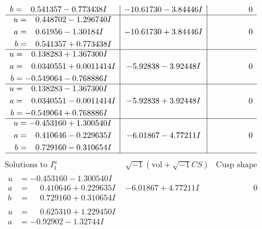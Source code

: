 \documentclass[1p]{elsarticle_modified}
\theoremstyle{definition}
\newcommand{\I}{\sqrt{-1}}
\begin{document}
$$\begin{array}{c|c|c}
\begin{aligned}
b &= \phantom{-}0.541357 - 0.773438 I\end{aligned}
 & -10.61730 - 3.84446 I & \phantom{-0.000000 } 0 \\ \hline\begin{aligned}
u &= \phantom{-}0.448702 - 1.296740 I \\
a &= \phantom{-}0.61956 - 1.30184 I \\
b &= \phantom{-}0.541357 + 0.773438 I\end{aligned}
 & -10.61730 + 3.84446 I & \phantom{-0.000000 } 0 \\ \hline\begin{aligned}
u &= \phantom{-}0.138283 + 1.367300 I \\
a &= \phantom{-}0.0340551 + 0.0011414 I \\
b &= -0.549064 - 0.768886 I\end{aligned}
 & -5.92838 - 3.92448 I & \phantom{-0.000000 } 0 \\ \hline\begin{aligned}
u &= \phantom{-}0.138283 - 1.367300 I \\
a &= \phantom{-}0.0340551 - 0.0011414 I \\
b &= -0.549064 + 0.768886 I\end{aligned}
 & -5.92838 + 3.92448 I & \phantom{-0.000000 } 0 \\ \hline\begin{aligned}
u &= -0.453160 + 1.300540 I \\
a &= \phantom{-}0.410646 - 0.229635 I \\
b &= \phantom{-}0.729160 - 0.310654 I\end{aligned}
 & -6.01867 - 4.77211 I & \phantom{-0.000000 } 0\\
 \hline 
 \end{array}$$\newpage$$\begin{array}{c|c|c}  
\text{Solutions to }I^u_{1}& \I (\text{vol} + \sqrt{-1}CS) & \text{Cusp shape}\\
 \hline 
\begin{aligned}
u &= -0.453160 - 1.300540 I \\
a &= \phantom{-}0.410646 + 0.229635 I \\
b &= \phantom{-}0.729160 + 0.310654 I\end{aligned}
 & -6.01867 + 4.77211 I & \phantom{-0.000000 } 0 \\ \hline\begin{aligned}
u &= \phantom{-}0.625310 + 1.229450 I \\
a &= -0.92902 - 1.32744 I \\

\end{aligned}
\end{array}$$
\end{document}
